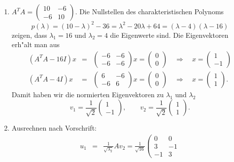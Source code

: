 \begin{bbspX}
\begin{enumerate}
\item
$A^T A =
\left(\begin{array}{cc} 10 &-6\\-6 & 10\end{array}\right)$. Die Nullstellen des charakteristischen Polynoms 
$$ p(\lambda) = (10-\lambda)^2-36 = \lambda^2 -20\lambda+64 = (\lambda-4)(\lambda-16)$$
zeigen, dass $\lambda_1 = 16$ und $\lambda_2 = 4$ die Eigenwerte sind. 
Die Eigenvektoren erh"alt man aus
\begin{eqnarray*}
(A^T A - 16I) x &=& \left(\begin{array}{cc} -6 &-6\\-6 &
-6\end{array}\right)x = \left(\begin{array}{c} 0\\0\end{array}\right) \quad \Rightarrow \quad x = \left(\begin{array}{c} 1\\-1\end{array}\right)\\
(A^T A - 4I) x &=& \left(\begin{array}{cc} 6 &-6\\-6 &
6\end{array}\right)x = \left(\begin{array}{c} 0\\0\end{array}\right)\quad \Rightarrow \quad x = \left(\begin{array}{c} 1\\1\end{array}\right).
\end{eqnarray*}
Damit haben wir die normierten Eigenvektoren zu $\lambda_{1}$ und $\lambda_2$
$$
v_{1} = \frac{1}{\sqrt{2}}\left(\begin{array}{c} 1 \\ -1\end{array}\right),\qquad
v_{2} = \frac{1}{\sqrt{2}}\left(\begin{array}{c}  1 \\ 1\end{array}\right)
.$$
\item
Ausrechnen nach Vorschrift:
\begin{eqnarray*}
u_1 & = & \frac{1}{\sqrt{\lambda_2}}Av_2 = \frac{1}{\sqrt{16}}\left(\begin{array}{cc} 0  & 0 \\3 & -1\\ -1 &3

\end{array}
\end{eqnarray*}
\end{enumerate}
\end{bbspX}
